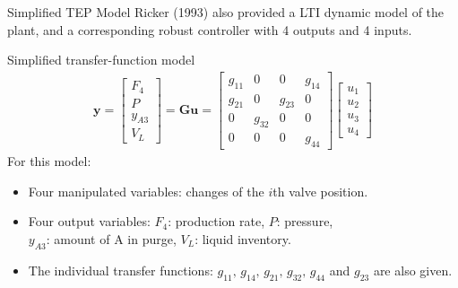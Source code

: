 \documentclass[10pt]{beamer}
\begin{document}
  \begin{frame}{Simplified TEP Model}
    Ricker (1993) also provided a LTI dynamic model of the plant, and a corresponding robust controller with 4 outputs and 4 inputs.
    \begin{block}{Simplified transfer-function model}
      \begin{align*}
        \textbf{y}= \begin{bmatrix}
          F_4\\ 
          P\\ 
          y_{A3}\\
          V_L 
        \end{bmatrix}=\textbf{G}\textbf{u}=\begin{bmatrix}
          g_{11} & 0 & 0 & g_{14}\\ 
          g_{21} & 0 & g_{23} & 0\\ 
          0 & g_{32} & 0 & 0\\ 
          0 & 0 & 0 & g_{44} 
        \end{bmatrix}\begin{bmatrix}
          u_1\\ 
          u_2\\ 
          u_3\\ 
          u_4
        \end{bmatrix}
      \end{align*}
      For this model:\\
      \begin{itemize}
      \item Four manipulated variables: changes of the $i$th valve position.
      \item Four output variables: $F_4$: production rate, $P$: pressure,\\ $y_{A3}$: amount of A in purge, $V_L$: liquid inventory. 
      \item The individual transfer functions: $g_{11},\, g_{14},\, g_{21},\, g_{32},\, g_{44}$ and $g_{23}$ are also given. 
      \end{itemize}
    \end{block}
  \end{frame}
\end{document}
